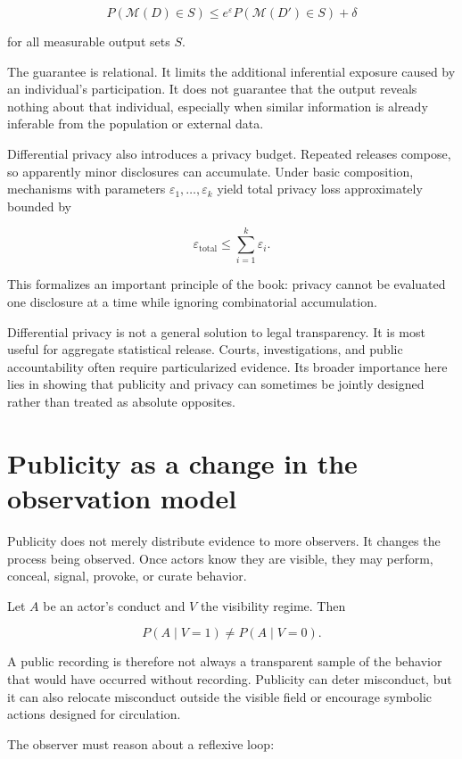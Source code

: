 \[
P(\mathcal M(D)\in S)
\leq
e^\varepsilon
P(\mathcal M(D')\in S)
+\delta
\]

for all measurable output sets \(S\).

The guarantee is relational. It limits the additional inferential exposure caused by an individual's participation. It does not guarantee that the output reveals nothing about that individual, especially when similar information is already inferable from the population or external data.

Differential privacy also introduces a privacy budget. Repeated releases compose, so apparently minor disclosures can accumulate. Under basic composition, mechanisms with parameters \(\varepsilon_1,\ldots,\varepsilon_k\) yield total privacy loss approximately bounded by

\[
\varepsilon_{\mathrm{total}}
\leq
\sum_{i=1}^{k}\varepsilon_i.
\]

This formalizes an important principle of the book: privacy cannot be evaluated one disclosure at a time while ignoring combinatorial accumulation.

Differential privacy is not a general solution to legal transparency. It is most useful for aggregate statistical release. Courts, investigations, and public accountability often require particularized evidence. Its broader importance here lies in showing that publicity and privacy can sometimes be jointly designed rather than treated as absolute opposites.

\section{Publicity as a change in the observation model}
\label{sec:a51}

Publicity does not merely distribute evidence to more observers. It changes the process being observed. Once actors know they are visible, they may perform, conceal, signal, provoke, or curate behavior.

Let \(A\) be an actor's conduct and \(V\) the visibility regime. Then

\[
P(A\mid V=1)
\neq
P(A\mid V=0).
\]

A public recording is therefore not always a transparent sample of the behavior that would have occurred without recording. Publicity can deter misconduct, but it can also relocate misconduct outside the visible field or encourage symbolic actions designed for circulation.

The observer must reason about a reflexive loop:

